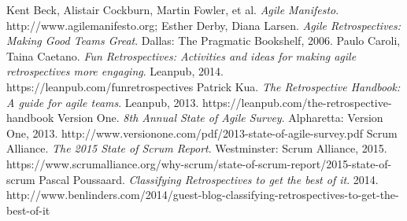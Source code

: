 \begin{thebibliography}{7} 

 Kent Beck, Alistair Cockburn, Martin Fowler, et al. \textit{Agile Manifesto}. http://www.agilemanifesto.org;
 Esther Derby, Diana Larsen. \textit{Agile Retrospectives: Making Good Teams Great}. Dallas: The Pragmatic Bookshelf, 2006.
 Paulo Caroli, Taina Caetano. \textit{Fun Retrospectives: Activities and ideas for making agile retrospectives more engaging}. Leanpub, 2014. https://leanpub.com/funretrospectives
 Patrick Kua. \textit{The Retrospective Handbook: A guide for agile teams}. Leanpub, 2013. https://leanpub.com/the-retrospective-handbook
 Version One. \textit{8th Annual State of Agile Survey}. Alpharetta: Version One, 2013. http://www.versionone.com/pdf/2013-state-of-agile-survey.pdf
 Scrum Alliance. \textit{The 2015 State of Scrum Report}. Westminster: Scrum Alliance, 2015. https://www.scrumalliance.org/why-scrum/state-of-scrum-report/2015-state-of-scrum
 Pascal Poussaard. \textit{Classifying Retrospectives to get the best of it}. 2014. http://www.benlinders.com/2014/guest-blog-classifying-retrospectives-to-get-the-best-of-it


\end{thebibliography}
